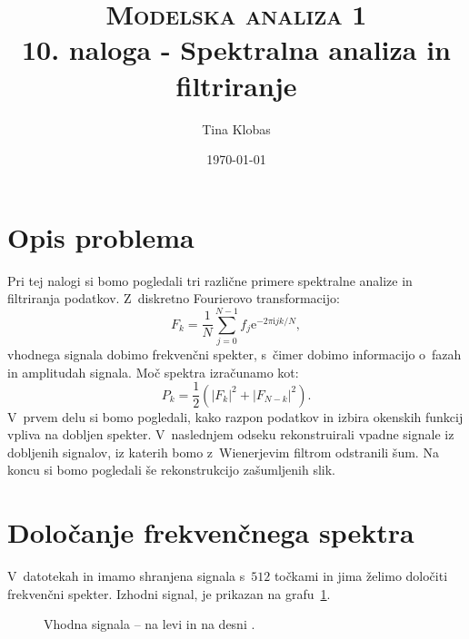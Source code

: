 \documentclass[a4paper,pdftex,10pt]{article}
\title{	
\normalfont \normalsize 
\textsc{Modelska analiza 1} \\ [25pt] %
\huge 10. naloga - Spektralna analiza in filtriranje\\ %
}
\author{Tina Klobas} %
\date{\normalsize\today} %
\numberwithin{figure}{section} %
\begin{document}
\maketitle %

\section{Opis problema}
Pri tej nalogi si bomo pogledali tri različne primere spektralne analize in filtriranja
podatkov. Z~diskretno Fourierovo transformacijo:
\begin{equation}
    F_k = \frac{1}{N} \sum_{j=0}^{N-1} f_j \mathrm{e}^{- 2\pi \mathrm{i} j k /N},
\end{equation}
vhodnega signala dobimo frekvenčni spekter, s~čimer dobimo informacijo o~fazah in amplitudah
signala. Moč spektra izračunamo kot:
\begin{equation}
    P_k = \frac{1}{2} ( | F_k |^2 + |F_{N-k}|^2 ). 
\end{equation}
V~prvem delu si bomo pogledali, kako razpon podatkov in izbira okenskih funkcij vpliva
na dobljen spekter. V~naslednjem odseku rekonstruirali vpadne signale iz dobljenih signalov,
iz katerih bomo z~Wienerjevim filtrom odstranili šum. Na koncu si bomo pogledali še 
rekonstrukcijo zašumljenih slik.

\section{Določanje frekvenčnega spektra}
V~datotekah  in  imamo shranjena signala s~$512$ točkami in
jima želimo določiti frekvenčni spekter. Izhodni signal, je prikazan na grafu~\ref{slika1}. 
\begin{figure}[H] 
    \centering
    \resizebox{0.49\linewidth}{!}{}
    \resizebox{0.49\linewidth}{!}{}
    \caption{Vhodna signala -- na levi \protect{} in na desni 
    \protect{}.}
    \label{slika1}
\end{figure}
\end{document}
